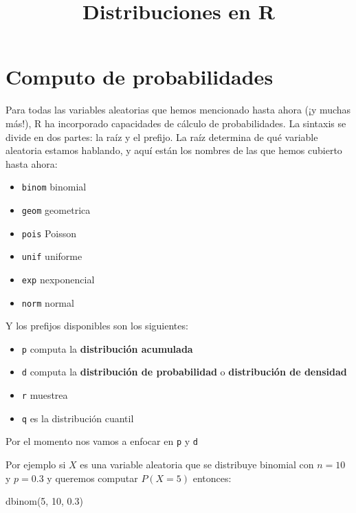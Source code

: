 \documentclass[
]{article}
\title{Distribuciones en R}
\author{}
\date{\vspace{-2.5em}}
\newenvironment{Shaded}{\begin{snugshade}}{\end{snugshade}}
\newcommand{\DecValTok}[1]{\textcolor[rgb]{0.00,0.00,0.81}{#1}}
\newcommand{\FloatTok}[1]{\textcolor[rgb]{0.00,0.00,0.81}{#1}}
\newcommand{\FunctionTok}[1]{\textcolor[rgb]{0.00,0.00,0.00}{#1}}
\newcommand{\NormalTok}[1]{#1}
\providecommand{\tightlist}{%
  \setlength{\itemsep}{0pt}\setlength{\parskip}{0pt}}
\begin{document}
\maketitle

\hypertarget{computo-de-probabilidades}{%
\section{Computo de probabilidades}\label{computo-de-probabilidades}}

Para todas las variables aleatorias que hemos mencionado hasta ahora (¡y
muchas más!), R ha incorporado capacidades de cálculo de probabilidades.
La sintaxis se divide en dos partes: la raíz y el prefijo. La raíz
determina de qué variable aleatoria estamos hablando, y aquí están los
nombres de las que hemos cubierto hasta ahora:

\begin{itemize}
\tightlist
\item
  \texttt{binom} binomial
\item
  \texttt{geom} geometrica
\item
  \texttt{pois} Poisson
\item
  \texttt{unif} uniforme
\item
  \texttt{exp} nexponencial
\item
  \texttt{norm} normal
\end{itemize}

Y los prefijos disponibles son los siguientes:

\begin{itemize}
\tightlist
\item
  \texttt{p} computa la \textbf{distribución acumulada}
\item
  \texttt{d} computa la \textbf{distribución de probabilidad} o
  \textbf{distribución de densidad}\\
\item
  \texttt{r} muestrea
\item
  \texttt{q} es la distribución cuantil
\end{itemize}

Por el momento nos vamos a enfocar en \texttt{p} y \texttt{d}

Por ejemplo si \(X\) es una variable aleatoria que se distribuye
binomial con \(n=10\) y \(p=0.3\) y queremos computar \(P(X=5)\)
entonces:

\begin{Shaded}
\begin{Highlighting}[]
\FunctionTok{dbinom}\NormalTok{(}\DecValTok{5}\NormalTok{, }\DecValTok{10}\NormalTok{, }\FloatTok{0.3}\NormalTok{)}
\end{Highlighting}
\end{Shaded}
\end{document}

